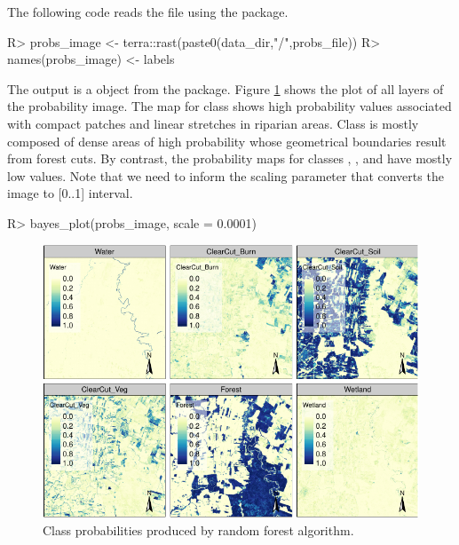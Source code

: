 \documentclass[
  shortnames]{jss}
\begin{document}
The following code reads the file using the  package.

\begin{CodeChunk}
\begin{CodeInput}
R> probs_image <- terra::rast(paste0(data_dir,"/",probs_file))
R> names(probs_image) <- labels
\end{CodeInput}
\end{CodeChunk}

The output is a  object from the  package. Figure \ref{fig:pcube} shows the plot of all layers of the probability image. The map for class  shows high probability values associated with compact patches and linear stretches in riparian areas. Class  is mostly composed of dense areas of high probability whose geometrical boundaries result from forest cuts. By contrast, the probability maps for classes , , and  have mostly low values. Note that we need to inform the scaling parameter that converts the image to {[}0..1{]} interval.

\begin{CodeChunk}
\begin{CodeInput}
R> bayes_plot(probs_image, scale = 0.0001)
\end{CodeInput}
\begin{figure}[h]

{\centering \includegraphics{Bayesian_smoothing_JSS_files/figure-latex/pcube-1} 

}

\caption[Class probabilities produced by random forest algorithm]{Class probabilities produced by random forest algorithm.}\label{fig:pcube}
\end{figure}
\end{CodeChunk}
\end{document}
